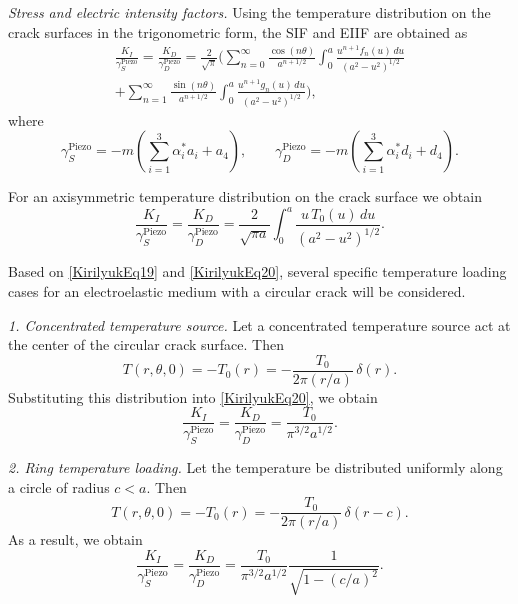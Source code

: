 \medskip
\emph{Stress and electric intensity factors.} Using the temperature distribution on the crack surfaces in the trigonometric form,
the SIF and EIIF are obtained as
\begin{multline}
	\frac{K_I}{\gamma_S^{\text{Piezo}}}
	=
	\frac{K_D}{\gamma_D^{\text{Piezo}}}
	=
	\frac{2}{\sqrt{\pi}}
	\Bigg(
	\sum_{n=0}^{\infty}
	\frac{\cos(n\theta)}{a^{n+1/2}}
	\int_{0}^{a}
	\frac{u^{n+1}f_n(u)\,du}{(a^2-u^2)^{1/2}}
	\\
	+
	\sum_{n=1}^{\infty}
	\frac{\sin(n\theta)}{a^{n+1/2}}
	\int_{0}^{a}
	\frac{u^{n+1}g_n(u)\,du}{(a^2-u^2)^{1/2}}
	\Bigg),
	\label{KirilyukEq19}
\end{multline}
%
where
\[
\gamma_S^{\text{Piezo}}
=
-m\left(\sum_{i=1}^{3}\alpha_i^{*}a_i+a_4\right),
\qquad
\gamma_D^{\text{Piezo}}
=
-m\left(\sum_{i=1}^{3}\alpha_i^{*}d_i+d_4\right).
\]

For an axisymmetric temperature distribution on the crack surface we obtain
\begin{equation}
	\frac{K_I}{\gamma_S^{\text{Piezo}}}
	=
	\frac{K_D}{\gamma_D^{\text{Piezo}}}
	=
	\frac{2}{\sqrt{\pi a}}
	\int_{0}^{a}
	\frac{u\,T_0(u)\,du}{(a^2-u^2)^{1/2}} .
	\label{KirilyukEq20}
\end{equation}

Based on \eqref{KirilyukEq19} and \eqref{KirilyukEq20}, several specific temperature loading cases for an electroelastic medium with a circular crack will be considered.

\medskip
\emph{1. Concentrated temperature source.} Let a concentrated temperature source act at the center of the circular crack surface. Then
\[
T(r,\theta,0) = -T_0(r) = -\frac{T_0}{2\pi (r/a)}\,\delta(r).
\]
Substituting this distribution into \eqref{KirilyukEq20}, we obtain
\begin{equation}
	\frac{K_I}{\gamma_S^{\text{Piezo}}}
	=
	\frac{K_D}{\gamma_D^{\text{Piezo}}}
	=
	\frac{T_0}{\pi^{3/2}a^{1/2}} .
	\label{KirilyukEq21}
\end{equation}

\medskip
\emph{2. Ring temperature loading.} Let the temperature be distributed uniformly along a circle of radius $c<a$. Then
\[
T(r,\theta,0) = -T_0(r) = -\frac{T_0}{2\pi (r/a)}\,\delta(r-c).
\]
As a result, we obtain
\begin{equation}
	\frac{K_I}{\gamma_S^{\text{Piezo}}}
	=
	\frac{K_D}{\gamma_D^{\text{Piezo}}}
	=
	\frac{T_0}{\pi^{3/2}a^{1/2}}
	\frac{1}{\sqrt{1-(c/a)^2}} .
	\label{KirilyukEq22}
\end{equation}

